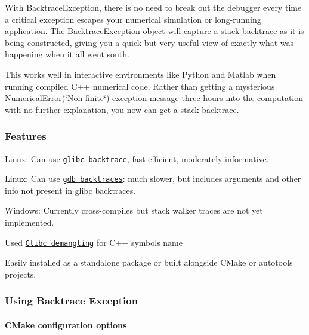With Backtrace\-Exception, there is no need to break out the debugger every time a critical exception escapes your numerical simulation or long-\/running application. The Backtrace\-Exception object will capture a stack backtrace as it is being constructed, giving you a quick but very useful view of exactly what was happening when it all went south.

This works well in interactive environments like Python and Matlab when running compiled C++ numerical code. Rather than getting a mysterious {\ttfamily Numerical\-Error(\char`\"{}\-Non finite\char`\"{})} exception message three hours into the computation with no further explanation, you now can get a stack backtrace.

\subsubsection*{Features}


\begin{DoxyItemize}
\item Linux\-: Can use \href{https://www.gnu.org/software/libc/manual/html_node/Backtraces.html}{\tt glibc backtrace}, fast efficient, moderately informative.
\item Linux\-: Can use \href{https://ftp.gnu.org/old-gnu/Manuals/gdb/html_node/gdb_42.html}{\tt gdb backtraces}\-: much slower, but includes arguments and other info not present in glibc backtraces.
\item Windows\-: Currently cross-\/compiles but stack walker traces are not yet implemented.
\item Used \href{https://gcc.gnu.org/onlinedocs/libstdc++/manual/ext_demangling.html}{\tt Glibc demangling} for C++ symbols name
\item Easily installed as a standalone package or built alongside C\-Make or autotools projects.
\end{DoxyItemize}

\subsubsection*{Using Backtrace Exception}

\paragraph*{C\-Make configuration options}